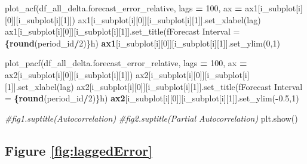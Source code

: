 \documentclass[mstat,12pt]{unswthesis}
\newenvironment{Shaded}{\begin{snugshade}}{\end{snugshade}}
\newcommand{\CommentTok}[1]{\textcolor[rgb]{0.56,0.35,0.01}{\textit{#1}}}
\newcommand{\DecValTok}[1]{\textcolor[rgb]{0.00,0.00,0.81}{#1}}
\newcommand{\ErrorTok}[1]{\textcolor[rgb]{0.64,0.00,0.00}{\textbf{#1}}}
\newcommand{\FloatTok}[1]{\textcolor[rgb]{0.00,0.00,0.81}{#1}}
\newcommand{\NormalTok}[1]{#1}
\newcommand{\OperatorTok}[1]{\textcolor[rgb]{0.81,0.36,0.00}{\textbf{#1}}}
\newcommand{\SpecialStringTok}[1]{\textcolor[rgb]{0.31,0.60,0.02}{#1}}
\newcommand{\StringTok}[1]{\textcolor[rgb]{0.31,0.60,0.02}{#1}}
\begin{document}
\begin{Shaded}
\begin{Highlighting}[]
\NormalTok{    plot\_acf(df\_all\_delta.forecast\_error\_relative, lags }\OperatorTok{=} \DecValTok{100}\NormalTok{, }
\NormalTok{      ax }\OperatorTok{=}\NormalTok{ ax1[i\_subplot[i][}\DecValTok{0}\NormalTok{]][i\_subplot[i][}\DecValTok{1}\NormalTok{]])}
\NormalTok{    ax1[i\_subplot[i][}\DecValTok{0}\NormalTok{]][i\_subplot[i][}\DecValTok{1}\NormalTok{]].set\_xlabel(}\StringTok{\textquotesingle{}lag\textquotesingle{}}\NormalTok{)}
\NormalTok{    ax1[i\_subplot[i][}\DecValTok{0}\NormalTok{]][i\_subplot[i][}\DecValTok{1}\NormalTok{]].set\_title(}\SpecialStringTok{f\textquotesingle{}Forecast Interval = }
\ErrorTok{      \{round}\NormalTok{(period\_id}\OperatorTok{/}\DecValTok{2}\NormalTok{)\}h}\StringTok{\textquotesingle{})    }
\ErrorTok{    ax1}\NormalTok{[i\_subplot[i][}\DecValTok{0}\NormalTok{]][i\_subplot[i][}\DecValTok{1}\NormalTok{]].set\_ylim(}\DecValTok{0}\NormalTok{,}\DecValTok{1}\NormalTok{)}
    
\NormalTok{    plot\_pacf(df\_all\_delta.forecast\_error\_relative, lags }\OperatorTok{=} \DecValTok{100}\NormalTok{, }
\NormalTok{        ax }\OperatorTok{=}\NormalTok{ ax2[i\_subplot[i][}\DecValTok{0}\NormalTok{]][i\_subplot[i][}\DecValTok{1}\NormalTok{]])}
\NormalTok{    ax2[i\_subplot[i][}\DecValTok{0}\NormalTok{]][i\_subplot[i][}\DecValTok{1}\NormalTok{]].set\_xlabel(}\StringTok{\textquotesingle{}lag\textquotesingle{}}\NormalTok{)}
\NormalTok{    ax2[i\_subplot[i][}\DecValTok{0}\NormalTok{]][i\_subplot[i][}\DecValTok{1}\NormalTok{]].set\_title(}\SpecialStringTok{f\textquotesingle{}Forecast Interval = }
\ErrorTok{        \{round}\NormalTok{(period\_id}\OperatorTok{/}\DecValTok{2}\NormalTok{)\}h}\StringTok{\textquotesingle{})}
\ErrorTok{    ax2}\NormalTok{[i\_subplot[i][}\DecValTok{0}\NormalTok{]][i\_subplot[i][}\DecValTok{1}\NormalTok{]].set\_ylim(}\OperatorTok{{-}}\FloatTok{0.5}\NormalTok{,}\DecValTok{1}\NormalTok{)}
    
\CommentTok{\#fig1.suptitle(\textquotesingle{}Autocorrelation\textquotesingle{})}
\CommentTok{\#fig2.suptitle(\textquotesingle{}Partial Autocorrelation\textquotesingle{})}
\NormalTok{plt.show()}
\end{Highlighting}
\end{Shaded}

\subsection*{Figure \ref{fig:laggedError}}\label{figure-reffiglaggederror}
\end{document}
